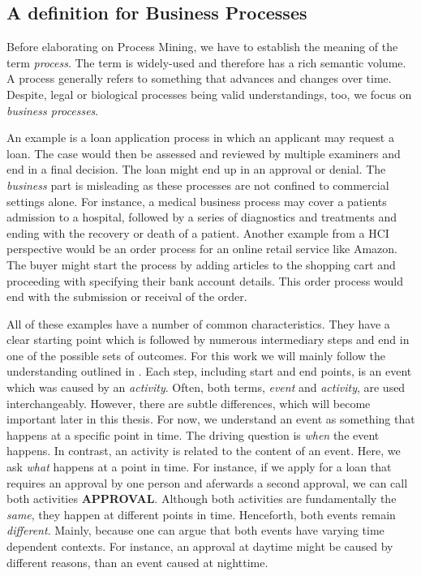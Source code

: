 \documentclass[./../../paper.tex]{subfiles}
\begin{document}
\subsection{A definition for Business Processes}
Before elaborating on Process Mining, we have to establish the meaning of the term \emph{process}. The term is widely-used and therefore has a rich semantic volume. A process generally refers to something that advances and changes over time\autocite{_DefinitionPROCESS_}.
Despite, legal or biological processes being valid understandings, too, we focus on \emph{business processes}.

An example is a loan application process in which an applicant may request a loan. The case would then be assessed and reviewed by multiple examiners and end in a final decision. The loan might end up in an approval or denial. The \emph{business} part is misleading as these processes are not confined to commercial settings alone. For instance, a medical business process may cover a patients admission to a hospital, followed by a series of diagnostics and treatments and ending with the recovery or death of a patient. Another example from a \gls{HCI} perspective would be an order process for an online retail service like Amazon. The buyer might start the process by adding articles to the shopping cart and proceeding with specifying their bank account details. This order process would end with the submission or receival of the order.

All of these examples have a number of common characteristics. They have a clear starting point which is followed by numerous intermediary steps and end in one of the possible sets of outcomes. For this work we will mainly follow the understanding outlined in \citeauthor{vanderaalst_ProcessMiningManifesto_2012}\autocite{vanderaalst_ProcessMiningManifesto_2012}. Each step, including start and end points, is an \gls{event} which was caused by an \emph{activity}. Often, both terms, \emph{event} and \emph{activity}, are used interchangeably. However, there are subtle differences, which will become important later in this thesis. For now, we understand an event as something that happens at a specific point in time. The driving question is \emph{when} the event happens. In contrast, an activity is related to the content of an event. Here, we ask \emph{what} happens at a point in time. For instance, if we apply for a loan that requires an approval by one person and aferwards a second approval, we can call both activities \textbf{APPROVAL}. Although both activities are fundamentally the \emph{same}, they happen at different points in time. Henceforth, both events remain \emph{different}. Mainly, because one can argue that both events have varying time dependent contexts. For instance, an approval at daytime might be caused by different reasons, than an event caused at nighttime.     
\end{document}
